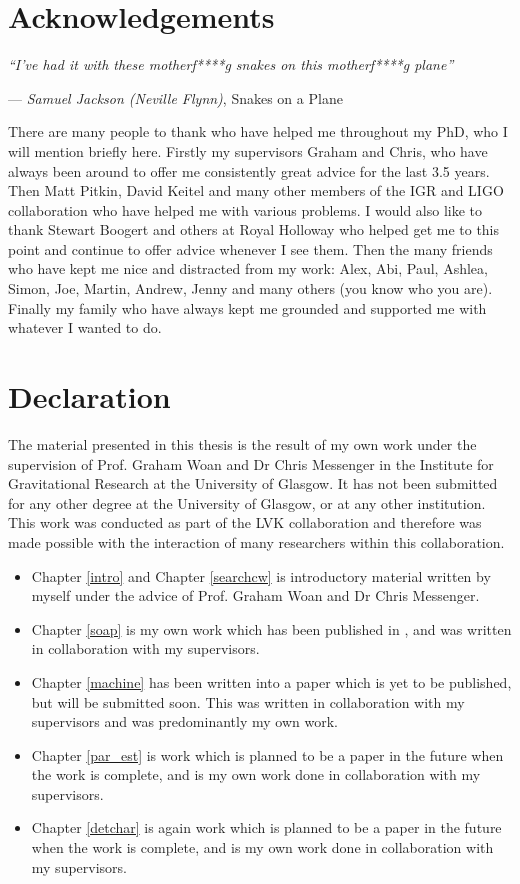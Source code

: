 \section*{Acknowledgements}

\epigraph{\textit{``I've had it with these motherf****g snakes on this motherf****g plane''}}{ --- \textit{Samuel Jackson (Neville Flynn)}, Snakes on a Plane}

There are many people to thank who have helped me throughout my PhD, who I will mention briefly here.
Firstly my supervisors Graham and Chris, who have always been around to offer me consistently great advice for the last 3.5 years.
Then Matt Pitkin, David Keitel and many other members of the IGR and LIGO collaboration who have helped me with various problems.
I would also like to thank Stewart Boogert and others at Royal Holloway who helped get me to this point and continue to offer advice whenever I see them.
Then the many friends who have kept me nice and distracted from my work: Alex, Abi, Paul, Ashlea, Simon, Joe, Martin, Andrew, Jenny and many others (you know who you are).
Finally my family who have always kept me grounded and supported me with whatever I wanted to do.

\section*{Declaration}

The material presented in this thesis is the result of my own work under the
supervision of Prof. Graham Woan and Dr Chris Messenger in the Institute for
Gravitational Research at the University of Glasgow. It has not been submitted
for any other degree at the University of Glasgow, or at any other institution.
This work was conducted as part of the \gls{LVK} collaboration and therefore
was made possible with the interaction of many researchers within this
collaboration.

\begin{itemize}
	\item Chapter \ref{intro} and Chapter \ref{searchcw} is introductory material written by myself under the advice of Prof. Graham Woan and Dr Chris Messenger.
	\item Chapter \ref{soap} is my own work which has been published in \citep{bayley2019SOAPGeneralised}, and was written in collaboration with my supervisors.
	\item Chapter \ref{machine} has been written into a paper which is yet to be published, but will be submitted soon. This was written in collaboration with my supervisors and was predominantly my own work.
	\item Chapter \ref{par_est} is work which is planned to be a paper in the future when the work is complete, and is my own work done in collaboration with my supervisors.
	\item Chapter \ref{detchar} is again work which is planned to be a paper in the future when the work is complete, and is my own work done in collaboration with my supervisors.
\end{itemize}